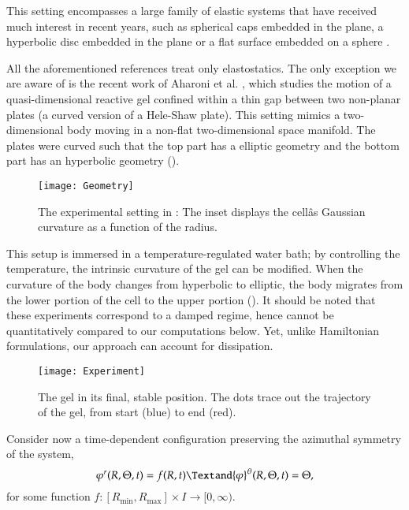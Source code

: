 \documentclass[smallextended]{svjour3}
\begin{document}
This setting encompasses a large family of elastic systems that have received much interest in recent years, such as spherical caps embedded in the plane, a hyperbolic disc embedded in the plane \cite{ESK09b} or a flat surface embedded on a sphere \cite{KSDM12}.  

All the aforementioned references treat only elastostatics.
The only exception we are aware of is the recent work of Aharoni et al. \cite{AKMMS16}, which studies the motion of a quasi-dimensional reactive gel confined within a thin gap between two non-planar plates (a curved version of a Hele-Shaw plate). This setting mimics a two-dimensional body moving in a non-flat two-dimensional space manifold.
The plates were curved such that the top part has a elliptic geometry and the bottom part has an hyperbolic geometry ().

\begin{figure}
\begin{center}
\texttt{[image: Geometry]}
\end{center}
\caption{The experimental setting in \cite{AKMMS16}: The inset displays the cellâs Gaussian curvature as a function of the radius.}
\label{fig:experiment1}
\end{figure}

This setup is immersed in a temperature-regulated water bath; by controlling the temperature,  the intrinsic curvature of the gel can be modified.  When the curvature of the body changes from hyperbolic to elliptic, the body migrates from the lower portion of the cell to the upper portion (). It should be noted that these experiments correspond to a damped regime, hence cannot be quantitatively compared to our computations below. Yet, unlike Hamiltonian formulations, our approach can account for dissipation. 

\begin{figure}
\begin{center}
\texttt{[image: Experiment]}
\end{center}
\caption{The gel in its final, stable position. The dots trace out the trajectory of the gel, from start (blue) to end (red).}
\label{fig:experiment2}
\end{figure}

Consider now a time-dependent configuration preserving the azimuthal symmetry of the system, 
\[
{\varphi}^r(R,\Theta,t) = f(R,t)
\Textand
{\varphi}^\theta(R,\Theta,t) = \Theta,
\]
for some function  $f:[{R_{\text{min}}},{R_{\text{max}}}]\times I \to [0,\infty)$.
\end{document}
